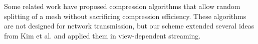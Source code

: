 \documentclass[11pt, a4paper]{report}
\begin{document}
     Some related work \cite{multiresolution:kim, random:yoon}
     have proposed compression algorithms that allow random splitting of a mesh without
     sacrificing compression efficiency.   These algorithms are not designed for 
	 network transmission, but our scheme extended several ideas from Kim et al. \cite{multiresolution:kim}
     and applied them in view-dependent streaming.  

\end{document}
